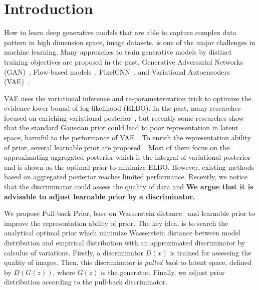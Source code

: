 \section{Introduction}

How to learn deep generative models that are able to capture complex data pattern in high dimension space, \EG image datasets, is one of the major challenges in machine learning. Many approaches to train generative models by distinct training objectives are proposed in the past, \EG Generative Adversarial Networks (GAN)~\cite{goodfellow2014generative}, Flow-based models~\cite{dinh2016density,kingma2018glow}, PixelCNN~\cite{van2016conditional}, and Variational Autoencoders (VAE)~\cite{kingma2014auto,rezende_stochastic_2014}.

VAE uses the variational inference and re-parameterization trick to optimize the evidence lower bound of log-likelihood (ELBO). In the past, many researches focused on enriching variational posterior~\cite{kingma2016improved,tomczak2016improving}, but recently some researches show that the standard Gaussian prior could lead to poor representation in latent space, harmful to the performance of VAE~\cite{tomczak2018vae}. To enrich the representation ability of prior, several learnable prior are proposed~\cite{tomczak2018vae,bauer2019resampled,takahashi2019variational}. Most of them focus on the approximating aggregated posterior which is the integral of variational posterior and is shown as the optimal prior to minimize ELBO. However, existing methods based on aggregated posterior reaches limited performance. Recently, we notice that the discriminator could assess the quality of data and \textbf{We argue that it is advisable to adjust learnable prior by a discriminator. }

We propose Pull-back Prior, base on Wasserstein distance~\cite{arjovsky2017wasserstein} and learnable prior to improve the representation ability of prior. The key idea, is to search the analytical optimal prior which minimize Wasserstein distance between model distribution and empirical distribution with an approximated discriminator by calculus of variations. 
Firstly, a discriminator $D(x)$ is trained for assessing the quality of images. Then, this discriminator is \textit{pulled back} to latent space, defined by $D(G(z))$, where $G(z)$ is the generator. Finally, we adjust prior distribution according to the pull-back discriminator. 

